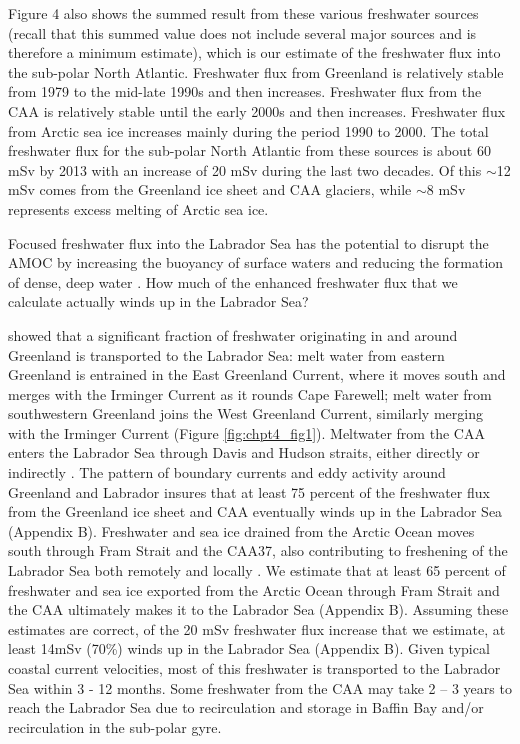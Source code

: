Figure 4 also shows the summed result from these various freshwater sources (recall that this summed value does not include several major sources and is therefore a minimum estimate), which is our estimate of the freshwater flux into the sub-polar North Atlantic. Freshwater flux from Greenland is relatively stable from 1979 to the mid-late 1990s and then increases.  Freshwater flux from the CAA is relatively stable until the early 2000s and then increases.  Freshwater flux from Arctic sea ice increases mainly during the period 1990 to 2000.  The total freshwater flux for the sub-polar North Atlantic from these sources is about 60 mSv by 2013 with an increase of 20 mSv during the last two decades. Of this $\sim$12 mSv comes from the Greenland ice sheet and CAA glaciers, while $\sim$8 mSv represents excess melting of Arctic sea ice. 

Focused freshwater flux into the Labrador Sea has the potential to disrupt the AMOC by increasing the buoyancy of surface waters and reducing the formation of dense, deep water \cite[]{stouffer2006}. How much of the enhanced freshwater flux that we calculate actually winds up in the Labrador Sea?

\citet{myers2009,myers2005} showed that a significant fraction of freshwater originating in and around Greenland is transported to the Labrador Sea: melt water from eastern Greenland is entrained in the East Greenland Current, where it moves south and merges with the Irminger Current as it rounds Cape Farewell; melt water from southwestern Greenland joins the West Greenland Current, similarly merging with the Irminger Current (Figure \ref{fig:chpt4_fig1}).  Meltwater from the CAA enters the Labrador Sea through Davis and Hudson straits, either directly or indirectly \cite[]{mcgeehan2012}.  The pattern of boundary currents and eddy activity around Greenland and Labrador insures that at least 75 percent of the freshwater flux from the Greenland ice sheet and CAA eventually winds up in the Labrador Sea (Appendix B).  Freshwater and sea ice drained from the Arctic Ocean moves south through Fram Strait and the CAA37, also contributing to freshening of the Labrador Sea both remotely and locally \cite[]{koenigk2006,peterson2006}.  We estimate that at least 65 percent of freshwater and sea ice exported from the Arctic Ocean through Fram Strait and the CAA ultimately makes it to the Labrador Sea (Appendix B).  Assuming these estimates are correct, of the 20 mSv freshwater flux increase that we estimate, at least 14mSv (70\%) winds up in the Labrador Sea (Appendix B).  Given typical coastal current velocities, most of this freshwater is transported to the Labrador Sea within 3 - 12 months.  Some freshwater from the CAA may take 2 – 3 years to reach the Labrador Sea due to recirculation and storage in Baffin Bay and/or recirculation in the sub-polar gyre. 

